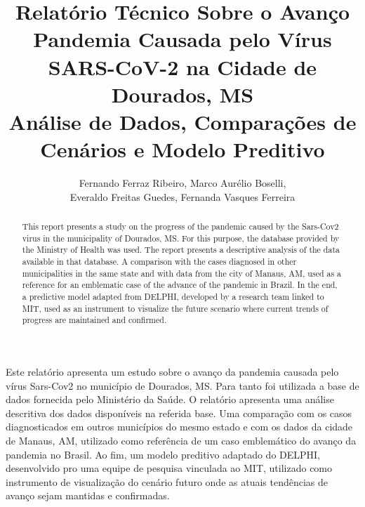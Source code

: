 \documentclass[12pt]{article}
\begin{document}
 


\title{Relatório Técnico Sobre o Avanço Pandemia Causada pelo Vírus SARS-CoV-2 na Cidade de Dourados, MS\\ Análise de Dados, Comparações de Cenários e Modelo Preditivo}

\author{Fernando Ferraz Ribeiro, Marco Aurélio Boselli,\\ Everaldo Freitas Guedes, Fernanda Vasques Ferreira}
  

 

\address{Universidade Federal da Bahia -- Faculdade de Arquitetura -- LCAD
  (UFBA)\\
  Salvador, BA -- Brasil
\nextinstitute
  Universidade Federal de Uberlândia  -- Instituto de Física (UFU)\\
  Uberlândia, MG -- Brasil 
\nextinstitute
  Bacharel em Estatística, Doutor e Mestre em \\Modelagem Computacional Aplicada à Tecnologia Industrial\\
  Salvador, BA -- Brasil
\nextinstitute
  Universidade Federal do Oeste da Bahia (UFOB)\\
  Barreiras, BA -- Brasil
}


\maketitle

\begin{abstract}
  This report presents a study on the progress of the pandemic caused by the Sars-Cov2 virus in the municipality of Dourados, MS. For this purpose, the database provided by the Ministry of Health was used. The report presents a descriptive analysis of the data available in that database. A comparison with the cases diagnosed in other municipalities in the same state and with data from the city of Manaus, AM, used as a reference for an emblematic case of the advance of the pandemic in Brazil. In the end, a predictive model adapted from DELPHI, developed by a research team linked to MIT, used as an instrument to visualize the future scenario where current trends of progress are maintained and confirmed.
\end{abstract}
     
\begin{resumo} 
  Este relatório apresenta um estudo sobre o avanço da pandemia causada pelo vírus Sars-Cov2 no município de Dourados, MS. Para tanto foi utilizada a base de dados fornecida pelo Ministério da Saúde. O relatório apresenta uma análise descritiva dos dados disponíveis na referida base. Uma comparação com os casos diagnosticados em outros municípios do mesmo estado e com os dados da cidade de Manaus, AM, utilizado como referência de um caso emblemático do avanço da pandemia no Brasil. Ao fim, um modelo preditivo adaptado do DELPHI, desenvolvido pro uma equipe de pesquisa vinculada ao MIT, utilizado como instrumento de visualização do cenário futuro onde as atuais tendências de avanço sejam mantidas e confirmadas.
\end{resumo}
\end{document}
